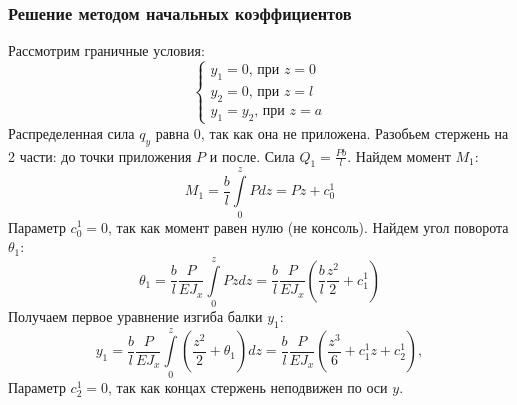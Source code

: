 \documentclass[12pt, a4paper]{article}
\begin{document}
\subsubsection{Решение методом начальных коэффициентов}

Рассмотрим граничные условия:
\begin{equation}
	\label{diffbsec}
	\begin{cases}
		y_1 = 0 \mbox{, при } z = 0\\
		y_2 = 0 \mbox{, при } z = l\\
		y_1 = y_2 \mbox{, при } z = a
	\end{cases}
\end{equation}
Распределенная сила $q_{y}$ равна  0, так как она не приложена. Разобьем стержень на 2 части: до точки приложения $P$ и после. Сила $Q_1 = \frac{P b}{l} $. 
Найдем момент $M_1$:
\begin{equation}
	\label{z221}
		M_1 = \frac{b}{l} \int\limits_0^z P d z = P z + c_0^1 
\end{equation}
Параметр $c_0^1 = 0$, так как момент равен нулю (не консоль).
Найдем угол поворота $\theta_1$:
\begin{equation}
	\label{z222}
	\theta_1 = \frac{b}{l} \frac{P}{E J_{x}} \int\limits_0^z P z d z = \frac{b}{l} \frac{P}{E J_{x}} (\frac{b}{l} \frac{z^2}{2} + c_1^1)
\end{equation}
Получаем первое уравнение изгиба балки $y_1$: 
\begin{equation}
	\label{z112}
	y_1 = \frac{b}{l} \frac{P}{E J_{x}} \int\limits_0^z (\frac{z^2}{2} + \theta_1) dz =  \frac{b}{l} \frac{P}{E J_{x}} (\frac{z^3}{6} + c_1^1 z + c_2^1),
\end{equation}
Параметр $c_2^1 = 0$, так как концах стержень неподвижен по оси $y$. 
\end{document}
